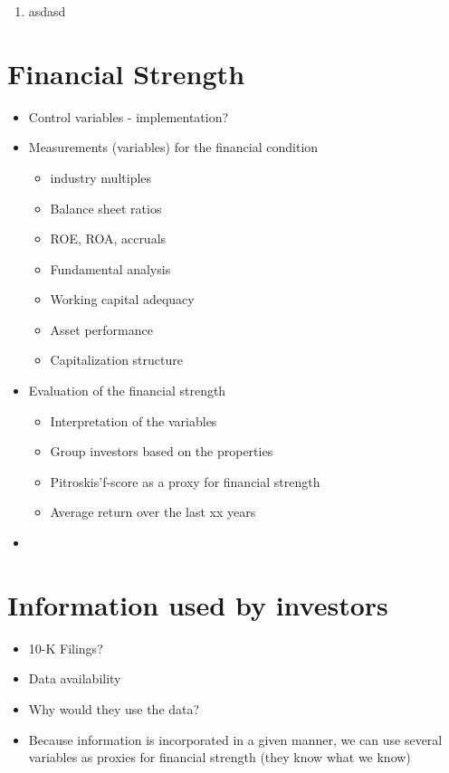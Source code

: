 \documentclass[12pt]{article}
\begin{document}
\begin{enumerate}
\begin{enumerate}
    \end{enumerate}
    
    \item asdasd

\end{enumerate}


\section{Financial Strength}

    \begin{itemize}
    \item Control variables - implementation?

    \item Measurements (variables) for the financial condition 

        \begin{itemize}
        \item industry multiples
        \item Balance sheet ratios
        \item ROE, ROA, accruals 
        \item Fundamental analysis
        \item Working capital adequacy
        \item Asset performance
        \item Capitalization structure
        \end{itemize}

    \item Evaluation of the financial strength

        \begin{itemize}
        \item Interpretation of the variables
        \item Group investors based on the properties
        \item Pitroskis'f-score as a proxy for financial strength
        \item Average return over the last xx years 
        \end{itemize}

    \item 
    \end{itemize}

\section{Information used by investors}

\begin{itemize}
    \item 10-K Filings? 
    \item Data availability
    \item Why would they use the data?
    \item Because information is incorporated in a given manner, we can use several variables as proxies for financial strength (they know what we know)
\end{itemize}
\end{document}

